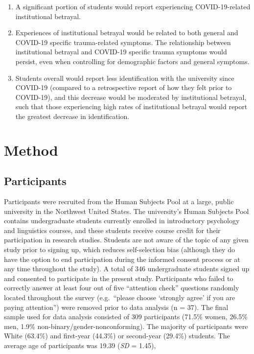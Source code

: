 \documentclass[
  english,
  man, noextraspace]{apa6}
\begin{document}
\begin{enumerate}
\def\labelenumi{\arabic{enumi}.}
\item
  A significant portion of students would report experiencing COVID-19-related institutional betrayal.
\item
  Experiences of institutional betrayal would be related to both general and COVID-19 specific trauma-related symptoms. The relationship between institutional betrayal and COVID-19 specific trauma symptoms would persist, even when controlling for demographic factors and general symptoms.
\item
  Students overall would report less identification with the university since COVID-19 (compared to a retrospective report of how they felt prior to COVID-19), and this decrease would be moderated by institutional betrayal, such that those experiencing high rates of institutional betrayal would report the greatest decrease in identification.
\end{enumerate}

\setlength{\parindent}{5ex}

\hypertarget{method}{%
\section{Method}\label{method}}

\hypertarget{participants}{%
\subsection{Participants}\label{participants}}

Participants were recruited from the Human Subjects Pool at a large, public university in the Northwest United States. The university's Human Subjects Pool contains undergraduate students currently enrolled in introductory psychology and linguistics courses, and these students receive course credit for their participation in research studies. Students are not aware of the topic of any given study prior to signing up, which reduces self-selection bias (although they do have the option to end participation during the informed consent process or at any time throughout the study). A total of 346 undergraduate students signed up and consented to participate in the present study. Participants who failed to correctly answer at least four out of five \enquote{attention check} questions randomly located throughout the survey (e.g.~\enquote{please choose \enquote{strongly agree} if you are paying attention}) were removed prior to data analysis (n = 37). The final sample used for data analysis consisted of 309 participants (71.5\% women, 26.5\% men, 1.9\% non-binary/gender-nonconforming). The majority of participants were White (63.4\%) and first-year (44.3\%) or second-year (29.4\%) students. The average age of participants was 19.39 (\emph{SD} = 1.45),
\end{document}
